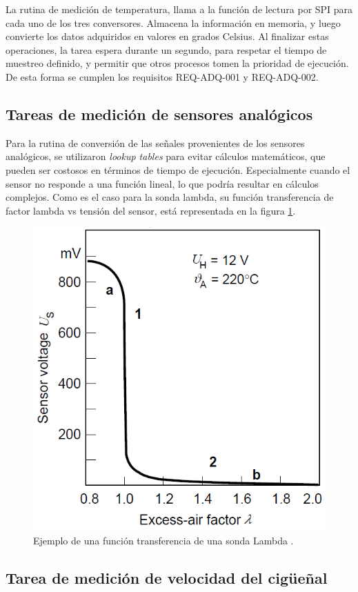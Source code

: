 La rutina de medición de temperatura, llama a la función de lectura por SPI para cada uno de los tres conversores. Almacena la información en memoria, y luego convierte los datos adquiridos en valores en grados Celsius. Al finalizar estas operaciones, la tarea espera durante un segundo, para respetar el tiempo de muestreo definido, y permitir que otros procesos tomen la prioridad de ejecución. De esta forma se cumplen los requisitos REQ-ADQ-001 y REQ-ADQ-002.

\subsection{Tareas de medición de sensores analógicos}

Para la rutina de conversión de las señales provenientes de los sensores analógicos, se utilizaron \textit{lookup tables} para evitar cálculos matemáticos, que pueden ser costosos en términos de tiempo de ejecución. Especialmente cuando el sensor no responde a una función lineal, lo que podría resultar en cálculos complejos. Como es el caso para la sonda lambda, su función transferencia de factor lambda vs tensión del sensor, está representada en la figura \ref{fig:funcion-lambda}.

\begin{figure}[htpb]
\centering
\includegraphics[width=.55\textwidth]{./Figures/funcion-lambda.png}
\caption{Ejemplo de una función transferencia de una sonda Lambda \protect\footnotemark[3].}
\label{fig:funcion-lambda}
\end{figure}

\subsection{Tarea de medición de velocidad del cigüeñal}

